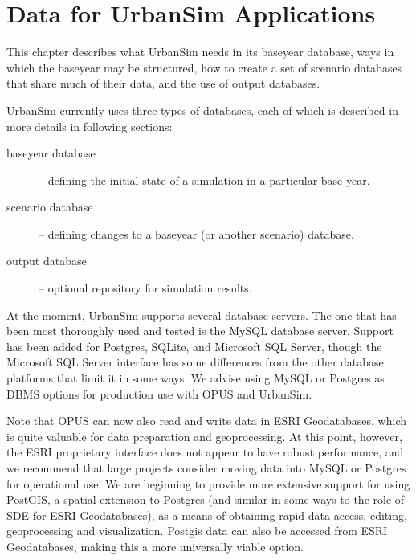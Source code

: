 
\chapter{Data for UrbanSim Applications}
\label{chapter:urbansim-database-tables}


This chapter describes what UrbanSim needs in its baseyear database, ways in
which the baseyear may be structured, how to create a set of scenario databases
that share much of their data, and the use of output databases.

UrbanSim currently uses three types of databases, each of which is described in
more details in following sections:

\begin{description}
\item[baseyear database] -- defining the initial state of a simulation in a
particular base year.
\item[scenario database] -- defining changes to a baseyear (or another scenario)
database.
\item[output database] -- optional repository for simulation results.
\end{description}

At the moment, UrbanSim supports several database servers.  The one that has been most thoroughly 
used and tested is the MySQL database server.  Support has been added for Postgres, 
SQLite, and Microsoft SQL Server, though the Microsoft SQL Server interface has some differences
from the other database platforms that limit it in some ways.  We advise using MySQL or Postgres as
 DBMS options for production use with OPUS and UrbanSim.

Note that OPUS can now also read and write data in ESRI Geodatabases, which is quite valuable for 
data preparation and geoprocessing.  At this point, however, the ESRI proprietary interface does
not appear to have robust performance, and we recommend that large projects consider moving
data into MySQL or Postgres for operational use.  We are beginning to provide more extensive
support for using PostGIS, a spatial extension to Postgres (and similar in some ways to the role of
SDE for ESRI Geodatabases), as a means of obtaining rapid data access, editing, geoprocessing
and visualization.  Postgis data can also be accessed from ESRI Geodatabases, making this
a more universally viable option.

